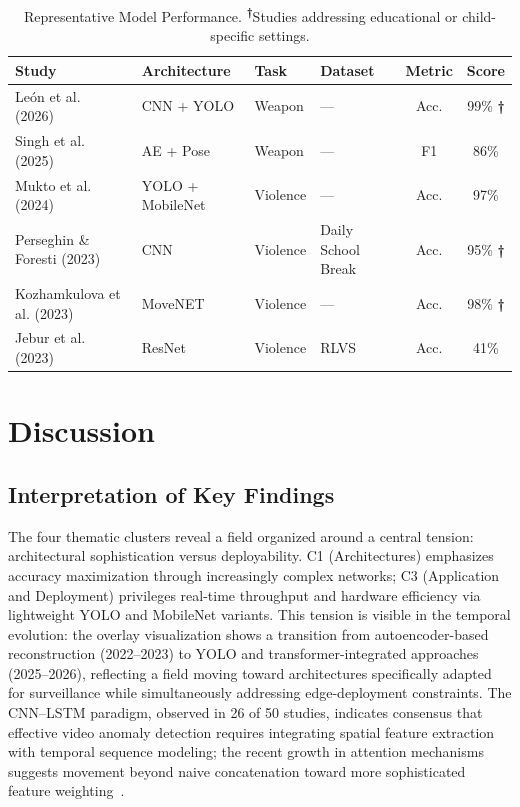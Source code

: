 \documentclass[conference]{IEEEtran}
\begin{document}
\begin{table}[t]
\caption{Representative Model Performance. \textsuperscript{\textbf{†}}Studies addressing educational or child-specific settings.}
\begin{center}
\scriptsize
\setlength{\tabcolsep}{2pt}
\renewcommand{\arraystretch}{1.1}
\begin{tabular}{|p{2.1cm}|p{2.0cm}|p{1.0cm}|p{1.8cm}|c|c|}
\hline
\textbf{Study} & \textbf{Architecture} & \textbf{Task} & \textbf{Dataset} & \textbf{Metric} & \textbf{Score} \\
\hline
Le\'{o}n et al. (2026)~\cite{b1} & CNN + YOLO & Weapon & — & Acc. & 99\% \textbf{†} \\
\hline
Singh et al. (2025)~\cite{b6} & AE + Pose & Weapon & — & F1 & 86\% \\
\hline
Mukto et al. (2024)~\cite{b3} & YOLO + MobileNet & Violence & — & Acc. & 97\% \\
\hline
Perseghin \& Foresti (2023)~\cite{b11} & CNN & Violence & Daily School Break & Acc. & 95\% \textbf{†} \\
\hline
Kozhamkulova et al. (2023)~\cite{b2} & MoveNET & Violence & — & Acc. & 98\% \textbf{†} \\
\hline
Jebur et al. (2023)~\cite{b18} & ResNet & Violence & RLVS & Acc. & 41\% \\
\hline
\end{tabular}
\label{tab:model-performance}
\end{center}
\end{table}

\section{Discussion}

\subsection{Interpretation of Key Findings}

The four thematic clusters reveal a field organized around a central tension: architectural sophistication versus deployability. C1 (Architectures) emphasizes accuracy maximization through increasingly complex networks; C3 (Application and Deployment) privileges real-time throughput and hardware efficiency via lightweight YOLO and MobileNet variants. This tension is visible in the temporal evolution: the overlay visualization shows a transition from autoencoder-based reconstruction (2022--2023) to YOLO and transformer-integrated approaches (2025--2026), reflecting a field moving toward architectures specifically adapted for surveillance while simultaneously addressing edge-deployment constraints. The CNN--LSTM paradigm, observed in 26 of 50 studies, indicates consensus that effective video anomaly detection requires integrating spatial feature extraction with temporal sequence modeling; the recent growth in attention mechanisms suggests movement beyond naive concatenation toward more sophisticated feature weighting~\cite{b5,b17}.
\end{document}

